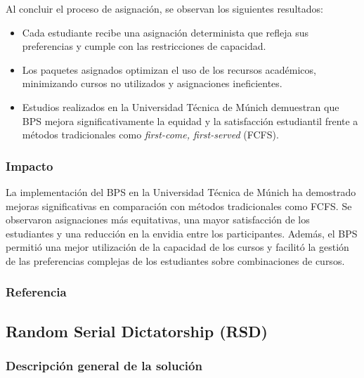 \documentclass{article}
\begin{document}
Al concluir el proceso de asignación, se observan los siguientes resultados:

\begin{itemize}
    \item Cada estudiante recibe una asignación determinista que refleja sus preferencias y cumple con las restricciones de capacidad.
    
    \item Los paquetes asignados optimizan el uso de los recursos académicos, minimizando cursos no utilizados y asignaciones ineficientes.

    \item Estudios realizados en la Universidad Técnica de Múnich demuestran que BPS mejora significativamente la equidad y la satisfacción estudiantil frente a métodos tradicionales como \textit{first-come, first-served} (FCFS).
\end{itemize}

\subsubsection{Impacto}

La implementación del BPS en la Universidad Técnica de Múnich ha demostrado mejoras significativas en comparación con métodos tradicionales como FCFS. Se observaron asignaciones más equitativas, una mayor satisfacción de los estudiantes y una reducción en la envidia entre los participantes. Además, el BPS permitió una mejor utilización de la capacidad de los cursos y facilitó la gestión de las preferencias complejas de los estudiantes sobre combinaciones de cursos.

\subsubsection{Referencia}


\subsection{Random Serial Dictatorship (RSD)}

\subsubsection{Descripción general de la solución}
\end{document}
